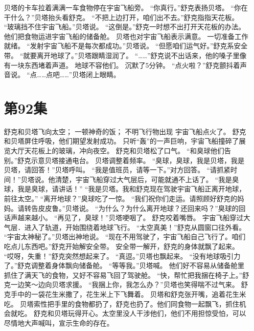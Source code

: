 \documentclass[a4paper,12pt,UTF8,twoside]{ctexbook}
\begin{document}
        贝塔的卡车拉着满满一车食物停在宇宙飞船旁。 
        “你真行。”舒克表扬贝塔。 
        “你在干什么？”贝塔抬头看舒克。 
        “不把上边打开，咱们出不去。”舒克指指天花板。 
        “玻璃挡不住宇宙飞船。”贝塔说。 
        “这倒是。”舒克一时想不出打开天花板的办法。 
        他们把食物运进宇宙飞船的储备舱。 
        贝塔也对宇宙飞船表示满意。 
        一切准备工作就绪。 
        “发射宇宙飞船不是每次都成功。”贝塔说。 
        “但愿咱们运气好。”舒克系安全带。 
        “就要离开地球了。”贝塔跟睛湿润了。 
        “……”舒克说不出话来，他的嗓子里像有一块东西堵着声道。 
        地球不容他们。 
         沉默了5分钟。 
        “点火啦？”舒克颤抖着声音说。 
        “点……点吧……”贝塔闭上眼睛。   \chapter{第92集} 
        舒克和贝塔飞向太空； 
        一顿神奇的饭； 
        不明飞行物出现   
        宇宙飞船点火了。 
        舒克和贝塔屏住呼吸，他们期望发射成功。 
        只听“轰”的一声巨响，宇宙飞船撞碎了展览大厅天花板上的玻璃，冲向夜空。 
        舒克和贝塔松了口气。 
        “和臭球他们告别。”舒克示意贝塔接通电台。 
        贝塔调整着频率。 
        “臭球，臭球，我是贝塔，我是贝塔，请回答！”贝塔呼叫。 
        “我是值班员，请等一下。”对方回答。 
        “请抓紧时间！”贝塔说。他清楚，宇宙飞船穿过大气层后，可能就通不上话了。 
        “我是臭球，我是臭球，请讲话！” 
        “我是贝塔。我和舒克现在驾驶宇宙飞船正离开地球，前往太空。” 
        “离开地球？”臭球吃了一惊。 
        “我们祝你们走运。请照顾好舒克的妈妈。请转告皮皮鲁。”贝塔说。 
        “为什么？为什么离开地球？还回来吗？”臭球的回话声越来越小。 
        “再见了，臭球！”贝塔哽咽了。 
        舒克咬着嘴唇。 
        宇宙飞船穿过大气层．进入了轨道，开始围绕着地球飞行。 
        “太空真美！”舒克从圆窗口往外看。 
        “宇宙太神秘了。”贝塔出神地说。 
        “现在不用驾驶了，宇宙飞船自己飞行了。咱们吃点儿东西吧。”舒克开始解安全带。 
        安全带一解开，舒克的身体就飘了起来。 
        “哎呀，失重！”舒克突然想起来了。 
        “真逗。”贝塔也飘起来。 
        “没有地球吸引力了。”舒克调整着身体飘向储备舱。 
        “等等我。”贝塔喊。 
        他们好不容易从储备舱里抓住了满天飞的食物，又好不容易飞回了驾驶舱。 
        “快，帮忙把我捆在椅子上。”舒克一边笑～边向贝塔求援。 
        “我捆上你，我怎么办？”贝塔也笑得喘不过气来。 
        舒克手中的一袋花生米撒了，花生米上下飞舞着。 
        贝塔和舒克张开嘴，追着花生米吃。 
        贝塔索性把手里的食物都扔了，舒克也扔了。他们同食物一起飘飞，抓住机会就吃。 
        舒克和贝塔玩得开心。太空里没人干涉他们，他们不用担惊受怕，可以尽情地大声喊叫，宣示生命的存在。 
\end{document}
